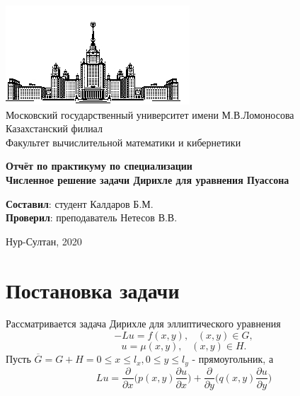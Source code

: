 \documentclass[a4paper, 12pt]{article}
\date{Сентябрь 2020}
\begin{document}
	
	\begin{titlepage}
		\begin{center}
			\includegraphics{msu_logo.jpg}
			\small
			~\\[0.1cm]
			Московский государственный университет имени М.В.Ломоносова
			~\\[0.1cm]
			Казахстанский филиал
			~\\[0.1cm]
			Факультет вычислительной математики и кибернетики
			~\\[1.0cm]
			\normalsize
		\end{center}
		\vspace{0.5cm}
		\begin{center}
			\textbf{\large{Отчёт по практикуму по специализации}}
			\\[1cm]
			\textbf{\large {Численное решение задачи Дирихле для уравнения
					Пуассона}}
			\\[2cm]
			\begin{normalsize}
				\vspace{2cm}
				\begin{flushright}
					\textbf{Составил}: студент Калдаров Б.М.
					\\[1cm]
					\textbf{Проверил}: преподаватель Нетесов В.В.
				\end{flushright}
				\normalsize
			\end{normalsize}
			\vfill 
			
			\small{Нур-Султан, 2020}
		\end{center} 
	\end{titlepage}
	\setcounter{page}{2}
	\tableofcontents
	
	\newpage
	\section{Постановка задачи}
	Рассматривается задача Дирихле для эллиптического уравнения
	\begin{equation}
		-Lu = f(x, y), \;\;\; (x, y) \in G,
	\end{equation}
	\begin{equation}
		u = \mu(x, y), \;\;\; (x, y) \in H.
	\end{equation}
	Пусть $\overline{G} = G + H = {0 \le x \le l_x, 0 \le y \le l_y}$ - прямоугольник, а
	\begin{equation}
		Lu = \frac{\partial}{\partial x} \bigg( p(x, y) \frac{\partial u}{\partial x} \bigg) + \frac{\partial}{\partial y} \bigg( q(x, y) \frac{\partial u}{\partial y} \bigg)
	\end{equation}
\end{document}

